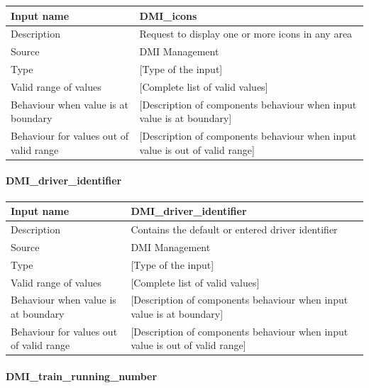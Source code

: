 \begin{longtable}{p{}p{}}
\toprule
Input name				& DMI\_icons \\
\midrule
Description				& Request to display one or more icons in any area \\
\midrule
Source					& DMI Management \\ 
\midrule
Type					& [Type of the input] \\
\midrule
Valid range of values	& [Complete list of valid values] \\
\midrule
Behaviour when value is at boundary	& [Description of components behaviour when input value is at boundary] \\
\midrule
Behaviour for values out of valid range	& [Description of components behaviour when input value is out of valid range] \\
\bottomrule
\end{longtable}

\paragraph{DMI\_driver\_identifier}

\begin{longtable}{p{}p{}}
\toprule
Input name				& DMI\_driver\_identifier \\
\midrule
Description				& Contains the default or entered driver identifier \\
\midrule
Source					& DMI Management \\ 
\midrule
Type					& [Type of the input] \\
\midrule
Valid range of values	& [Complete list of valid values] \\
\midrule
Behaviour when value is at boundary	& [Description of components behaviour when input value is at boundary] \\
\midrule
Behaviour for values out of valid range	& [Description of components behaviour when input value is out of valid range] \\
\bottomrule
\end{longtable}

\paragraph{DMI\_train\_running\_number}

